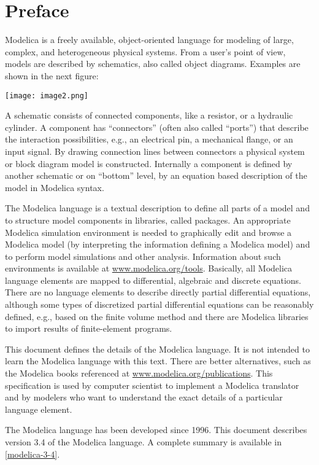 \chapter*{Preface}
Modelica is a freely available, object-oriented language for modeling of
large, complex, and heterogeneous physical systems. From a user's point
of view, models are described by schematics, also called object
diagrams. Examples are shown in the next figure:

\texttt{[image: image2.png]}

A schematic consists of connected components, like a resistor, or a
hydraulic cylinder. A component has ``connectors'' (often also called
``ports'') that describe the interaction possibilities, e.g., an
electrical pin, a mechanical flange, or an input signal. By drawing
connection lines between connectors a physical system or block diagram
model is constructed. Internally a component is defined by another
schematic or on ``bottom'' level, by an equation based description of
the model in Modelica syntax.

The Modelica language is a textual description to define all parts of a
model and to structure model components in libraries, called packages.
An appropriate Modelica simulation environment is needed to graphically
edit and browse a Modelica model (by interpreting the information
defining a Modelica model) and to perform model simulations and other
analysis. Information about such environments is available at
\href{http://www.modelica.org/tools}{www.modelica.org/tools}. Basically,
all Modelica language elements are mapped to differential, algebraic and
discrete equations. There are no language elements to describe directly
partial differential equations, although some types of discretized
partial differential equations can be reasonably defined, e.g., based on
the finite volume method and there are Modelica libraries to import
results of finite-element programs.

This document defines the details of the Modelica language. It is not
intended to learn the Modelica language with this text. There are better
alternatives, such as the Modelica books referenced at
\href{http://www.modelica.org/publications}{www.modelica.org/publications}.
This specification is used by computer scientist to implement a Modelica
translator and by modelers who want to understand the exact details of a
particular language element.

The Modelica language has been developed since 1996. This document
describes version 3.4 of the Modelica language. A complete summary is
available in \ref{modelica-3-4}.